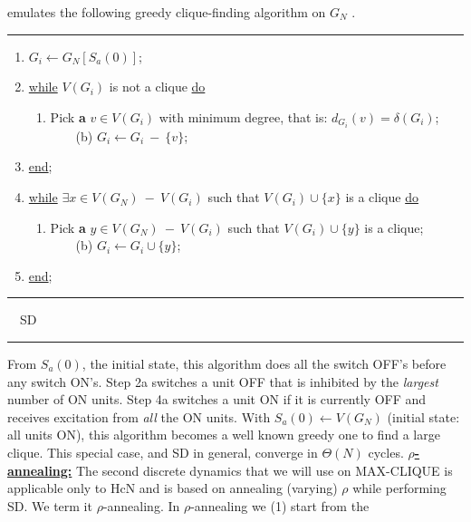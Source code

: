 emulates the following 
greedy clique-finding algorithm on $G_N$ \cite{kn:tr9025}. \newline
\rule{6.8in}{0.01in}
\begin{center}
\begin{enumerate}
\item $G_i \leftarrow G_N[S_a(0)]$;
\item \underline{while} $V(G_i)$ is not a clique \underline{do}
\begin{enumerate}
\item Pick {\bf a} $v \in V(G_i)$ with minimum degree, that is: $d_{G_{i}}(v) = \delta(G_i)$;
~~~~(b) $G_i \leftarrow G_i~-~\{v\}$;
\end{enumerate}
\item \underline{end};
\item \underline{while} $\exists x \in V(G_N)~-~V(G_i)$ such that $V(G_i) \cup \{x\}$ is a clique \underline{do}
\begin{enumerate}
\item Pick {\bf a} $y \in V(G_N)~-~V(G_i)$ such that $V(G_i) \cup \{y\}$ is a clique;
~~~~(b) $G_i \leftarrow G_i \cup \{y\}$;
\end{enumerate}
\item \underline{end};
\end{enumerate}
\end{center}
\rule{3.2in}{0.01in}
~~SD~~
\rule{3.2in}{0.01in}
From $S_a(0)$, the initial state, this algorithm does all the switch 
OFF's before any switch ON's.
Step 2a switches a unit OFF that is inhibited by the 
{\em largest} number of ON units. 
Step 4a switches a unit ON if it is currently OFF and receives 
excitation from {\em all} the ON units. 
With $S_a(0) \leftarrow V(G_N)$ (initial state: all units ON),
this algorithm becomes a well known 
greedy one to find a large clique. This special case, and SD in
general, converge
in $\Theta(N)$ cycles. \newline
\vspace*{0.05in}
\newline
{\underline{\bf $\rho$-annealing:}}
The second discrete dynamics that we will use on MAX-CLIQUE is applicable only 
to HcN and is based on annealing (varying) $\rho$ while performing
SD.
We term it $\rho$-annealing. 
In $\rho$-annealing we (1) start from the 
